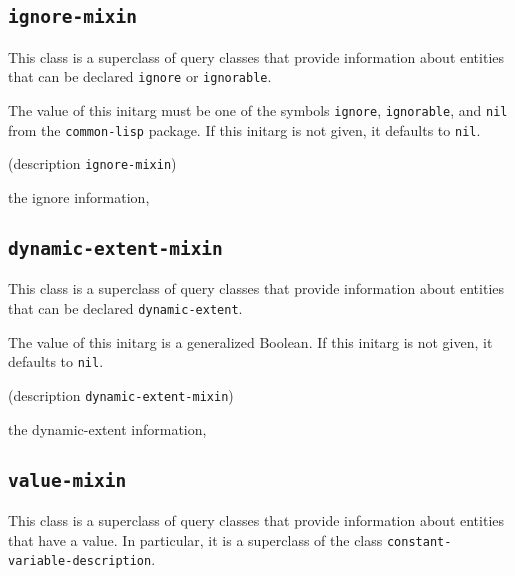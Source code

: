\subsection{\texttt{ignore-mixin}}
\label{sec-ignore-mixin}

{\footnotesize
{}
}

This class is a superclass of query classes that provide information
about entities that can be declared \texttt{ignore} or \texttt{ignorable}.

{\footnotesize
{}
}

The value of this initarg must be one of the symbols \texttt{ignore},
\texttt{ignorable}, and \texttt{nil} from the \texttt{common-lisp}
package.  If this initarg is not given, it defaults to \texttt{nil}.

{\footnotesize
{} {(description {\tt ignore-mixin})}
}

 the ignore information, 

\subsection{\texttt{dynamic-extent-mixin}}
\label{sec-dynamic-extent-mixin}

{\footnotesize
{}
}

This class is a superclass of query classes that provide information
about entities that can be declared \texttt{dynamic-extent}.

{\footnotesize
{}
}

The value of this initarg is a generalized Boolean.  If this initarg
is not given, it defaults to \texttt{nil}.

{\footnotesize
{} {(description {\tt dynamic-extent-mixin})}
}

 the dynamic-extent information, 

\subsection{\texttt{value-mixin}}
\label{sec-value-mixin}

{\footnotesize
{}
}

This class is a superclass of query classes that provide information
about entities that have a value.  In particular, it is a superclass
of the class \texttt{constant-variable-description}.

